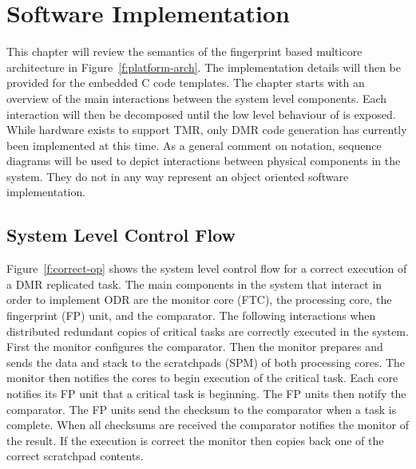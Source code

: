 
\chapter{Software Implementation} %

\label{c:soft-impl} %

	This chapter will review the semantics of the fingerprint based multicore architecture in Figure~\ref{f:platform-arch}. 
	The implementation details will then be provided for the embedded C code templates. 
	The chapter starts with an overview of the main interactions between the system level components. 
	Each interaction will then be decomposed until the low level behaviour of is exposed. While hardware exists to support TMR, only DMR code generation has currently been implemented at this time. 
	As a general comment on notation, sequence diagrams will be used to depict interactions between physical components in the system. They do not in any way represent an object oriented software implementation. 

	
\section{System Level Control Flow}
		
	Figure~\ref{f:correct-op} shows the system level control flow for a correct execution of a DMR replicated task.
	The main components in the system that interact in order to implement ODR are the monitor core (FTC), the processing core, the fingerprint (FP) unit, and the comparator. 
	The following interactions when distributed redundant copies of critical tasks are correctly executed in the system. 
	First the monitor configures the comparator. 
	Then the monitor prepares and sends the data and stack to the scratchpads (SPM) of both processing cores. 
	The monitor then notifies the cores to begin execution of the critical task. 
	Each core notifies its FP unit that a critical task is beginning. 
	The FP units then notify the comparator. 
	The FP units send the checksum to the comparator when a task is complete. 
	When all checksums are received the comparator notifies the monitor of the result. 
	If the execution is correct the monitor then copies back one of the correct scratchpad contents. 




